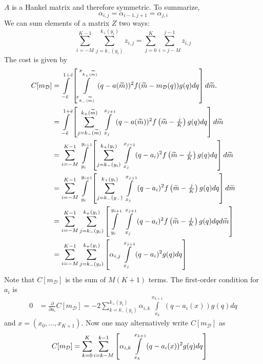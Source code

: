 \documentclass[12pt]{article}
\begin{document}
$A$ is a Hankel matrix and therefore symmetric. To summarize,
\begin{equation}
	\alpha_{i,j}=\alpha_{i-1,j+1}=\alpha_{j,i}
\end{equation}
We can sum elements of a matrix $Z$ two ways:
\begin{equation}
	\sum_{i=-M}^{K-1}{\sum_{j=k_{-}(y_{i})}^{k_{+}(y_{i})}{z_{i,j}}}=\sum_{j=0}^{K}{\sum_{i=j-M}^{j-1}{z_{i,j}}}
\end{equation}
The cost is given by 
\begin{align}
	C[m_{\mathcal{D}}]&=\int\displaylimits_{-\bar{e}}^{1+\bar{e}}{\left[\int\displaylimits_{x_{k_{-}(\widetilde{m})}}^{x_{k_{+}(\widetilde{m})}}{(q-a(\widetilde{m}))^{2}f(\widetilde{m}-m_{\mathcal{D}}(q))g(q)dq}\right]d\widetilde{m}}.\\
	&=\int\displaylimits_{-\bar{e}}^{1+\bar{e}}{\left[\sum_{j=k_{-}(\widetilde{m})}^{k_{+}(\widetilde{m})}{\int\displaylimits_{x_{j}}^{x_{j+1}}{(q-a(\widetilde{m}))^{2}f\left(\widetilde{m}-\tfrac{j}{K}\right)g(q)dq}}\right]d\widetilde{m}}\\
	&=\sum_{i=-M}^{K-1}{\int\displaylimits_{y_{i}}^{y_{i+1}}{\left[\sum_{j=k_{-}(y_{i})}^{k_{+}(y_{i})}{\int\displaylimits_{x_{j}}^{x_{j+1}}{(q-a_{i})^{2}f\left(\widetilde{m}-\tfrac{j}{K}\right)g(q)dq}}\right]d\widetilde{m}}}\\
	&=\sum_{i=-M}^{K-1}{\int\displaylimits_{y_{i}}^{y_{i+1}}{\left[\sum_{j=k_{-}(y_{-})}^{k_{+}(y_{i})}{\int\displaylimits_{x_{j}}^{x_{j+1}}{(q-a_{i})^{2}f\left(\widetilde{m}-\tfrac{j}{K}\right)g(q)dq}}\right]d\widetilde{m}}}\\
	&=\sum_{i=-M}^{K-1}{\sum_{j=k_{-}(y_{i})}^{k_{+}(y_{i})}{\left[\int\displaylimits_{y_{i}}^{y_{i+1}}{\:\int\displaylimits_{x_{j}}^{x_{j+1}}{(q-a_{i})^{2}f\left(\widetilde{m}-\tfrac{j}{K}\right)g(q)dq}}d\widetilde{m}\right]}}\\
	&=\sum_{i=-M}^{K-1}{\sum_{j=k_{-}(y_{i})}^{k_{+}(y_{i})}{\left[\alpha_{i,j}\int\displaylimits_{x_{j}}^{x_{j+1}}{(q-a_{i})^{2}g(q)dq}\right]}}
\end{align}
Note that $C[m_{\mathcal{D}}]$ is the sum of $M(K+1)$ terms. The first-order condition for $a_{i}$ is 
\begin{align}\label{foc_a}
	0&=\frac{\partial}{\partial a_{i}}C[m_{\mathcal{D}}]=-2\sum_{k=k_{-}(y_{i})}^{k_{+}(y_{i})}{\alpha_{i,k}\int\limits_{x_{k}}^{x_{k+1}}{(q-a_{i}(x))g(q)dq}}
\end{align}
and $x=(x_{0},\ldots,x_{K+1})$. Now one may alternatively write $C[m_{\mathcal{D}}]$ as
\begin{align}
	C[m_{\mathcal{D}}]&=\sum_{k=0}^{K}{\sum_{i=k-M}^{k-1}{\left[\alpha_{i,k}\int\displaylimits_{x_{k}}^{x_{k+1}}{(q-a_{i}(x))^{2}g(q)dq}\right]}}
\end{align}
\end{document}
